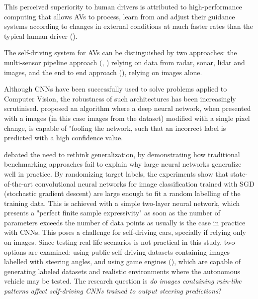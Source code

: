 This perceived superiority to human drivers is attributed to high-performance computing that allows AVs to process, learn from and adjust their guidance systems according
to changes in external conditions at much faster rates than the typical human driver  (\cite{west2016moving}).


The self-driving system for AVs can be distinguished by two approaches: the multi-sensor pipeline approach (\cite{Grigorescu_2020}, \cite{Yurtsever_2020}) relying on data from radar, sonar, lidar and images,
and the end to end approach (\cite{bojarski2016end}), relying on images alone. 

Although CNNs have been successfully used to solve problems applied to Computer Vision, the robustness of such architectures has been increasingly scrutinised. \cite{Su_2019} proposed an algorithm where a deep neural network, when presented with a images (in this case images from the \cite{CIFAR_10} dataset) modified with a single pixel change, is capable of "fooling the network, such that an incorrect label is predicted with a high confidence value.  


\cite{zhang2017understanding} debated the need to rethink generalization, by demonstrating how traditional benchmarking approaches fail to explain why large neural networks generalize well in practice. By randomizing target labels, the experiments show that state-of-the-art convolutional neural networks for image classification trained with SGD (stochastic gradient descent) are large enough to fit a random labelling of the training data. This is achieved with a simple two-layer neural network, which presents a "perfect finite sample expressivity" as soon as the number of parameters exceeds the number of data points as usually is the case in practice with CNNs.  
This poses a challenge for self-driving cars, specially if relying only on images. Since testing real life scenarios is not practical in this study, two options are examined: using public self-driving datasets containing images labelled with steering angles, and using game engines (\cite{cowan2014survey}), which are capable of generating labeled datasets and realistic environments where the autonomous vehicle may be tested.
The research question is \textit{do images containing rain-like patterns affect self-driving CNNs trained to output steering predictions}? 

